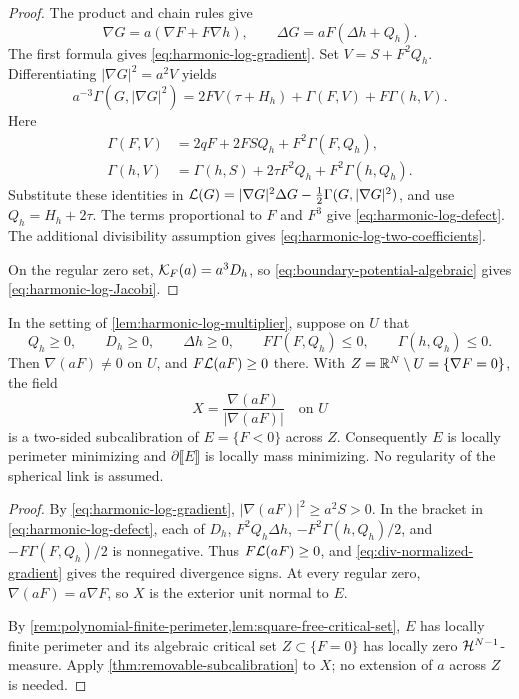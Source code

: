 \begin{proof}
The product and chain rules give
\[
 \nabla G=a(\nabla F+F\nabla h),\qquad
 \Delta G=aF(\Delta h+Q_h).
\]
The first formula gives \eqref{eq:harmonic-log-gradient}.  Set
\(V=S+F^2Q_h\).  Differentiating \(|\nabla G|^2=a^2V\) yields
\[
 a^{-3}\Gamma(G,|\nabla G|^2)
 =2FV(\tau+H_h)+\Gamma(F,V)+F\Gamma(h,V).
\]
Here
\[
 \begin{aligned}
 \Gamma(F,V)&=2qF+2FSQ_h+F^2\Gamma(F,Q_h),\\
 \Gamma(h,V)&=\Gamma(h,S)+2\tau F^2Q_h+
                                      F^2\Gamma(h,Q_h).
 \end{aligned}
\]
Substitute these identities in
\(\mathcal L(G)=|\nabla G|^2\Delta G-
\tfrac12\Gamma(G,|\nabla G|^2)\), and use
\(Q_h=H_h+2\tau\).  The terms proportional to \(F\) and
\(F^3\) give \eqref{eq:harmonic-log-defect}.
The additional divisibility assumption gives
\eqref{eq:harmonic-log-two-coefficients}.

On the regular zero set, \(\mathcal K_F(a)=a^3D_h\), so
\eqref{eq:boundary-potential-algebraic} gives
\eqref{eq:harmonic-log-Jacobi}.
\end{proof}

\begin{theorem}
\label{thm:harmonic-monotonicity-criterion}
In the setting of \cref{lem:harmonic-log-multiplier}, suppose on
\(U\) that
\begin{equation}\label{eq:harmonic-log-monotonicity}
 Q_h\ge0,\qquad D_h\ge0,\qquad \Delta h\ge0,\qquad
 F\Gamma(F,Q_h)\le0,\qquad \Gamma(h,Q_h)\le0.
\end{equation}
Then \(\nabla(aF)\ne0\) on \(U\), and
\(F\mathcal L(aF)\ge0\) there. With
\(Z=\mathbb R^N\setminus U=\{\nabla F=0\}\), the field
\[
 X=\frac{\nabla(aF)}{|\nabla(aF)|}\quad\text{on }U
\]
is a two-sided subcalibration of \(E=\{F<0\}\) across \(Z\).
Consequently \(E\) is locally perimeter minimizing and
\(\partial\llbracket E\rrbracket\) is locally mass minimizing.
No regularity of the spherical link is assumed.
\end{theorem}

\begin{proof}
By \eqref{eq:harmonic-log-gradient},
\(|\nabla(aF)|^2\ge a^2S>0\).  In the bracket in
\eqref{eq:harmonic-log-defect}, each of
\(D_h\), \(F^2Q_h\Delta h\),
\(-F^2\Gamma(h,Q_h)/2\), and
\(-F\Gamma(F,Q_h)/2\) is nonnegative.  Thus
\(F\mathcal L(aF)\ge0\), and
\eqref{eq:div-normalized-gradient} gives the required divergence
signs.  At every regular zero, \(\nabla(aF)=a\nabla F\), so
\(X\) is the exterior unit normal to \(E\).

By \cref{rem:polynomial-finite-perimeter,lem:square-free-critical-set},
\(E\) has locally finite perimeter and its algebraic critical set
\(Z\subset\{F=0\}\) has locally zero \(\mathcal H^{N-1}\)-measure.
Apply \cref{thm:removable-subcalibration} to \(X\); no extension
of \(a\) across \(Z\) is needed.
\end{proof}

